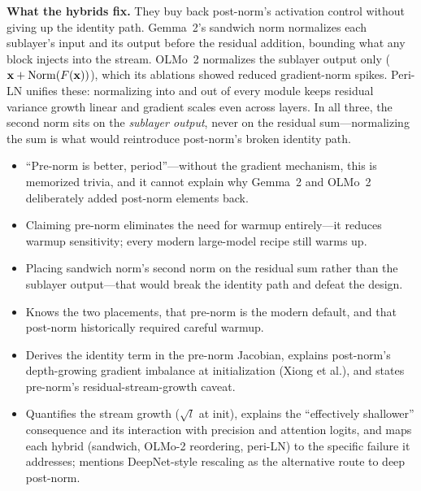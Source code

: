\begin{interviewq}
\textbf{What the hybrids fix.} They buy back post-norm's activation control without giving up the identity path. Gemma~2's sandwich norm normalizes each sublayer's input and its output before the residual addition, bounding what any block injects into the stream. OLMo~2 normalizes the sublayer output only ($\mathbf{x} + \mathrm{Norm}(F(\mathbf{x}))$), which its ablations showed reduced gradient-norm spikes. Peri-LN unifies these: normalizing into and out of every module keeps residual variance growth linear and gradient scales even across layers. In all three, the second norm sits on the \textit{sublayer output}, never on the residual sum---normalizing the sum is what would reintroduce post-norm's broken identity path.

\redflags
\begin{itemize}
    \item ``Pre-norm is better, period''---without the gradient mechanism, this is memorized trivia, and it cannot explain why Gemma~2 and OLMo~2 deliberately added post-norm elements back.
    \item Claiming pre-norm eliminates the need for warmup entirely---it reduces warmup sensitivity; every modern large-model recipe still warms up.
    \item Placing sandwich norm's second norm on the residual sum rather than the sublayer output---that would break the identity path and defeat the design.
\end{itemize}


\goodgreat
\begin{itemize}
    \item {} Knows the two placements, that pre-norm is the modern default, and that post-norm historically required careful warmup.
    \item {} Derives the identity term in the pre-norm Jacobian, explains post-norm's depth-growing gradient imbalance at initialization (Xiong et al.), and states pre-norm's residual-stream-growth caveat.
    \item {} Quantifies the stream growth ($\sqrt{l}$ at init), explains the ``effectively shallower'' consequence and its interaction with precision and attention logits, and maps each hybrid (sandwich, OLMo-2 reordering, peri-LN) to the specific failure it addresses; mentions DeepNet-style rescaling as the alternative route to deep post-norm.
\end{itemize}

\end{interviewq}

